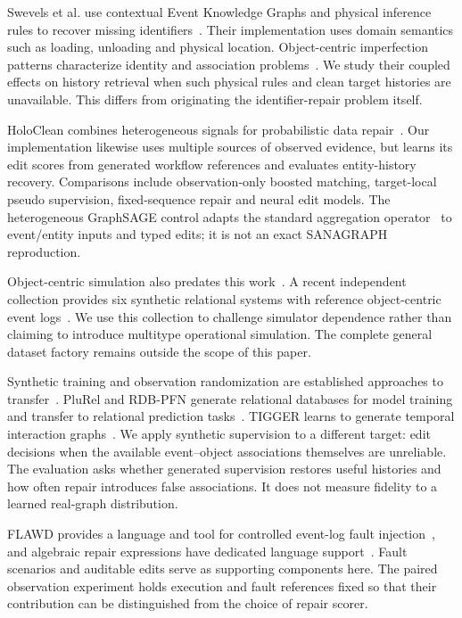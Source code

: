\documentclass[11pt]{article}
\begin{document}
Swevels et al. use contextual Event Knowledge Graphs and physical inference rules to recover missing identifiers~\cite{ekginference}. Their implementation uses domain semantics such as loading, unloading and physical location. Object-centric imperfection patterns characterize identity and association problems~\cite{ocip}. We study their coupled effects on history retrieval when such physical rules and clean target histories are unavailable. This differs from originating the identifier-repair problem itself.

HoloClean combines heterogeneous signals for probabilistic data repair~\cite{holoclean}. Our implementation likewise uses multiple sources of observed evidence, but learns its edit scores from generated workflow references and evaluates entity-history recovery. Comparisons include observation-only boosted matching, target-local pseudo supervision, fixed-sequence repair and neural edit models. The heterogeneous GraphSAGE control adapts the standard aggregation operator~\cite{graphsage} to event/entity inputs and typed edits; it is not an exact SANAGRAPH reproduction.

Object-centric simulation also predates this work~\cite{ocsim}. A recent independent collection provides six synthetic relational systems with reference object-centric event logs~\cite{relationalocel}. We use this collection to challenge simulator dependence rather than claiming to introduce multitype operational simulation. The complete general dataset factory remains outside the scope of this paper.

Synthetic training and observation randomization are established approaches to transfer~\cite{domainrandomization}. PluRel and RDB-PFN generate relational databases for model training and transfer to relational prediction tasks~\cite{plurel,rdbpfn}. TIGGER learns to generate temporal interaction graphs~\cite{tigger}. We apply synthetic supervision to a different target: edit decisions when the available event--object associations themselves are unreliable. The evaluation asks whether generated supervision restores useful histories and how often repair introduces false associations. It does not measure fidelity to a learned real-graph distribution.

FLAWD provides a language and tool for controlled event-log fault injection~\cite{flawd}, and algebraic repair expressions have dedicated language support~\cite{repairlanguage}. Fault scenarios and auditable edits serve as supporting components here. The paired observation experiment holds execution and fault references fixed so that their contribution can be distinguished from the choice of repair scorer.
\end{document}
